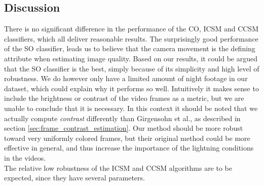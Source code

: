 \subsection{Discussion}\label{sec:phase1discussion}
%
There is no significant difference in the performance of the CO, ICSM and CCSM classifiers, which all deliver reasonable results. The surprisingly good performance of the SO classifier, leads us to believe that the camera movement is the defining attribute when estimating image quality. Based on our results, it could be argued that the SO classifier is the best, simply because of its simplicity and high level of robustness. We do however only have a limited amount of night footage in our dataset, which could explain why it performs so well. Intuitively it makes sense to include the brightness or contrast of the video frames as a metric, but we are unable to conclude that it is necessary. In this context it should be noted that we actually compute \textit{contrast} differently than Girgensohn et al.\cite{Girgensohn:2000:SAH:354401.354415}, as described in section \ref{sec:frame_contrast_estimation}. Our method should be more robust toward very uniformly colored frames, but their original method could be more effective in general, and thus increase the importance of the lightning conditions in the videos.\\
The relative low robustness of the ICSM and CCSM algorithms are to be expected, since they have several parameters.
%
